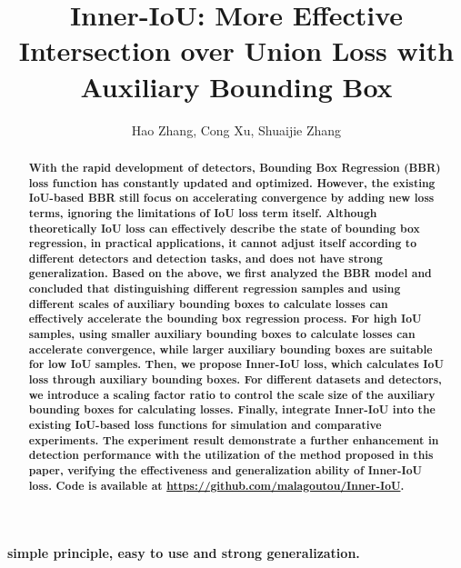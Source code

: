 \documentclass[lettersize,journal]{IEEEtran}
\begin{document}
	
	\title{Inner-IoU: More Effective Intersection over Union Loss with Auxiliary Bounding Box}
	
	\author{Hao Zhang, Cong Xu, Shuaijie Zhang}
	\maketitle
	
	\begin{abstract}
		\textbf{\bfseries{With the rapid development of detectors, Bounding Box Regression (BBR) loss function has constantly updated and optimized. However, the existing IoU-based BBR still focus on accelerating convergence by adding new loss terms, ignoring the limitations of IoU loss term itself. Although theoretically IoU loss
		can effectively describe the state of bounding box regression,
		in practical applications, it cannot adjust itself according to
		different detectors and detection tasks, and does not have strong
		generalization. Based on the above, we first analyzed the BBR model and concluded that distinguishing different regression samples and using different scales of auxiliary bounding boxes to calculate losses can effectively accelerate the bounding box regression process. For high IoU samples, using smaller auxiliary bounding boxes to calculate losses can accelerate convergence, while larger auxiliary bounding boxes are suitable for low IoU samples. Then, we propose Inner-IoU loss, which calculates IoU loss through auxiliary bounding boxes. For different datasets and detectors, we introduce a scaling factor ratio to control the scale size of the auxiliary bounding boxes for calculating losses. Finally, integrate Inner-IoU into the existing IoU-based loss functions for simulation and comparative experiments. The experiment result demonstrate a further enhancement in detection performance with the utilization of the method proposed in this paper, verifying the effectiveness and generalization ability of Inner-IoU loss. Code is available at \url{https://github.com/malagoutou/Inner-IoU}.}}
	\end{abstract}
	
	\begin{IEEEkeywords}
		\textbf{simple principle, easy to use and strong generalization.}
	\end{IEEEkeywords}
	
\end{document}
